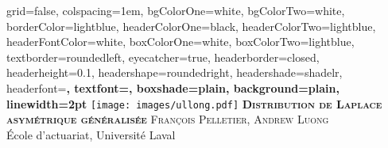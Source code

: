 \documentclass[landscape,final,a0paper,fontscale=0.285]{baposter}
\begin{document}

\begin{poster}%
  {
  grid=false,
  colspacing=1em,
  bgColorOne=white,
  bgColorTwo=white,
  borderColor=lightblue,
  headerColorOne=black,
  headerColorTwo=lightblue,
  headerFontColor=white,
  boxColorOne=white,
  boxColorTwo=lightblue,
  textborder=roundedleft,
  eyecatcher=true,
  headerborder=closed,
  headerheight=0.1\textheight,
  headershape=roundedright,
  headershade=shadelr,
  headerfont=\Large\bf\textsc, %
  textfont={\setlength{\parindent}{1.5em}},
  boxshade=plain,
  background=plain,
  linewidth=2pt
  }
  {\texttt{[image: images/ullong.pdf]}}
  {\bf\textsc{Distribution de Laplace asymétrique généralisée}\vspace{0.5em}}
  {\textsc{François Pelletier, Andrew Luong} \\ \small{École d'actuariat, Université Laval}}
  {%
   
  }

    \newcommand{\colouredcircle}{%
      \tikz{\useasboundingbox (-0.2em,-0.32em) rectangle(0.2em,0.32em); \draw[draw=black,fill=lightblue,line width=0.03em] (0,0) circle(0.18em);}}


\end{poster}
\end{document}
